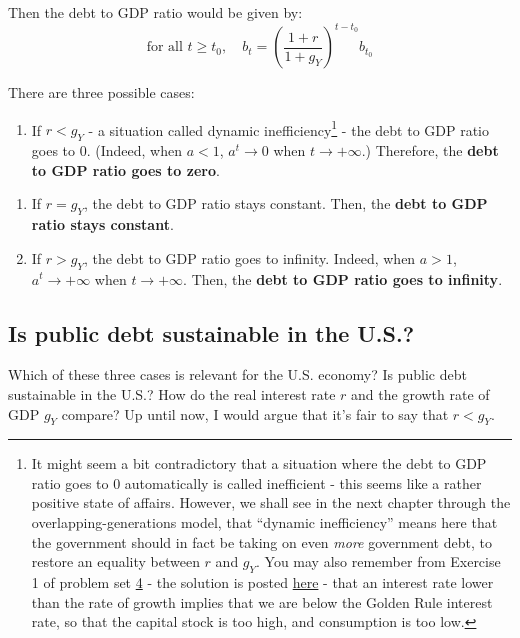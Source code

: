 \documentclass[]{book}
\providecommand{\tightlist}{%
  \setlength{\itemsep}{0pt}\setlength{\parskip}{0pt}}
\let\rmarkdownfootnote\footnote%
\def\footnote{\protect\rmarkdownfootnote}
\begin{document}
Then the debt to GDP ratio would be given by:
\[\boxed{\text{for all }t\geq t_{0},\quad b_t=\left(\frac{1+r}{1+g_Y}\right)^{t-t_{0}}b_{t_0}}\]

There are three possible cases:

\begin{enumerate}
\def\labelenumi{\arabic{enumi}.}
\tightlist
\item
  If \(r<g_Y\) - a situation called dynamic inefficiency\footnote{It
    might seem a bit contradictory that a situation where the debt to
    GDP ratio goes to 0 automatically is called inefficient - this seems
    like a rather positive state of affairs. However, we shall see in
    the next chapter through the overlapping-generations model, that
    ``dynamic inefficiency'' means here that the government should in
    fact be taking on even \emph{more} government debt, to restore an
    equality between \(r\) and \(g_Y\). You may also remember from
    Exercise 1 of problem set \protect\hyperlink{pset4}{4} - the
    solution is posted \protect\hyperlink{pset4-sol}{here} - that an
    interest rate lower than the rate of growth implies that we are
    below the Golden Rule interest rate, so that the capital stock is
    too high, and consumption is too low.} - the debt to GDP ratio goes
  to 0. (Indeed, when \(a<1\), \(a^{t}\to 0\) when \(t \to +\infty\).)
  Therefore, the \textbf{debt to GDP ratio goes to zero}.
\end{enumerate}

\begin{enumerate}
\def\labelenumi{\arabic{enumi}.}
\setcounter{enumi}{1}
\item
  If \(r=g_Y\), the debt to GDP ratio stays constant. Then, the
  \textbf{debt to GDP ratio stays constant}.
\item
  If \(r>g_Y\), the debt to GDP ratio goes to infinity. Indeed, when
  \(a>1\), \(a^{t}\to+\infty\) when \(t \to +\infty\). Then, the
  \textbf{debt to GDP ratio goes to infinity}.
\end{enumerate}

\subsection{Is public debt sustainable in the
U.S.?}\label{is-public-debt-sustainable-in-the-u.s.}

Which of these three cases is relevant for the U.S. economy? Is public
debt sustainable in the U.S.? How do the real interest rate \(r\) and
the growth rate of GDP \(g_Y\) compare? Up until now, I would argue that
it's fair to say that \(r<g_Y\).
\end{document}
